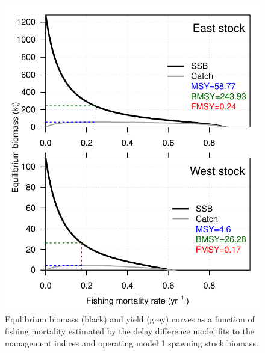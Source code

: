 \documentclass[]{article}
\begin{document}
\begin{figure}[htb]

{\centering \includegraphics[width=0.9\linewidth]{data/AM/1/BRP} 

}

\caption{Equlibrium biomass (black) and yield (grey) curves as a function of fishing mortality estimated by the delay difference model fits to the management indices and operating model 1 spawning stock biomass.}\label{fig:amRefPtsPlot}
\end{figure}

\newpage
\singlespacing 
\end{document}
